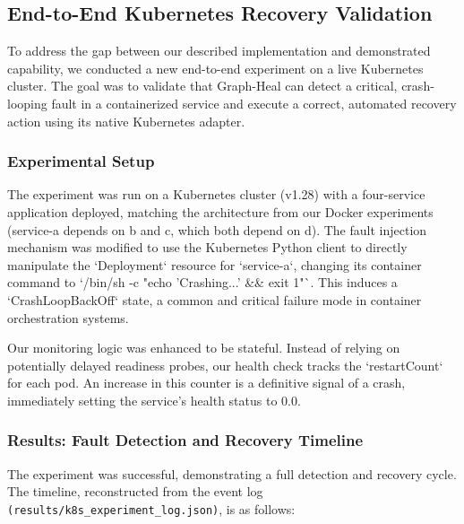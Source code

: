 \documentclass[11pt,conference]{IEEEtran}
\begin{document}
\subsection{End-to-End Kubernetes Recovery Validation}

To address the gap between our described implementation and demonstrated capability, we conducted a new end-to-end experiment on a live Kubernetes cluster. The goal was to validate that Graph-Heal can detect a critical, crash-looping fault in a containerized service and execute a correct, automated recovery action using its native Kubernetes adapter.

\subsubsection{Experimental Setup}
The experiment was run on a Kubernetes cluster (v1.28) with a four-service application deployed, matching the architecture from our Docker experiments (service-a depends on b and c, which both depend on d). The fault injection mechanism was modified to use the Kubernetes Python client to directly manipulate the `Deployment` resource for `service-a`, changing its container command to `/bin/sh -c "echo 'Crashing...' && exit 1"`. This induces a `CrashLoopBackOff` state, a common and critical failure mode in container orchestration systems.

Our monitoring logic was enhanced to be stateful. Instead of relying on potentially delayed readiness probes, our health check tracks the `restartCount` for each pod. An increase in this counter is a definitive signal of a crash, immediately setting the service's health status to 0.0.

\subsubsection{Results: Fault Detection and Recovery Timeline}
The experiment was successful, demonstrating a full detection and recovery cycle. The timeline, reconstructed from the event log \texttt{(results/k8s\_experiment\_log.json)}, is as follows:
\end{document}
